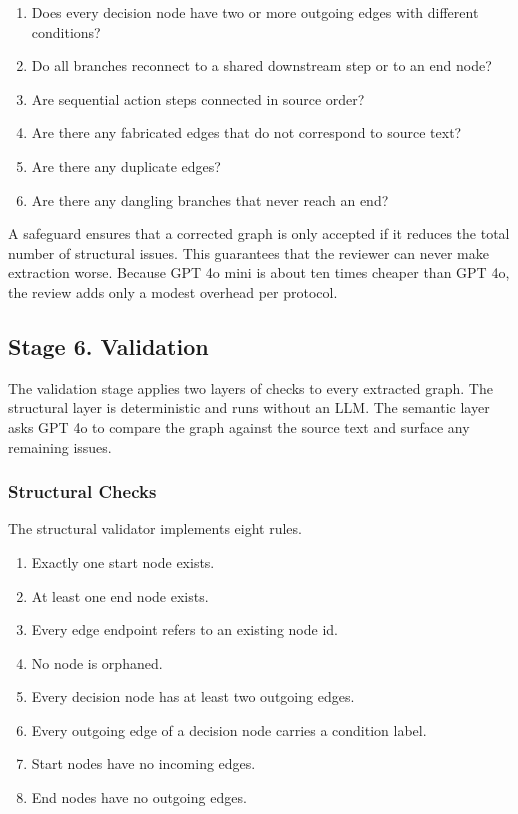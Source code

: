 \documentclass{article}
\begin{document}
\begin{enumerate}[leftmargin=2em]
    \item Does every decision node have two or more outgoing edges
    with different conditions?
    \item Do all branches reconnect to a shared downstream step or to
    an end node?
    \item Are sequential action steps connected in source order?
    \item Are there any fabricated edges that do not correspond to
    source text?
    \item Are there any duplicate edges?
    \item Are there any dangling branches that never reach an end?
\end{enumerate}

A safeguard ensures that a corrected graph is only accepted if it
reduces the total number of structural issues. This guarantees that
the reviewer can never make extraction worse. Because GPT 4o mini is
about ten times cheaper than GPT 4o, the review adds only a modest
overhead per protocol.

\subsection{Stage 6. Validation}

The validation stage applies two layers of checks to every extracted
graph. The structural layer is deterministic and runs without an LLM.
The semantic layer asks GPT 4o to compare the graph against the source
text and surface any remaining issues.

\subsubsection{Structural Checks}

The structural validator implements eight rules.

\begin{enumerate}[leftmargin=2em]
    \item Exactly one start node exists.
    \item At least one end node exists.
    \item Every edge endpoint refers to an existing node id.
    \item No node is orphaned.
    \item Every decision node has at least two outgoing edges.
    \item Every outgoing edge of a decision node carries a condition
    label.
    \item Start nodes have no incoming edges.
    \item End nodes have no outgoing edges.
\end{enumerate}
\end{document}
